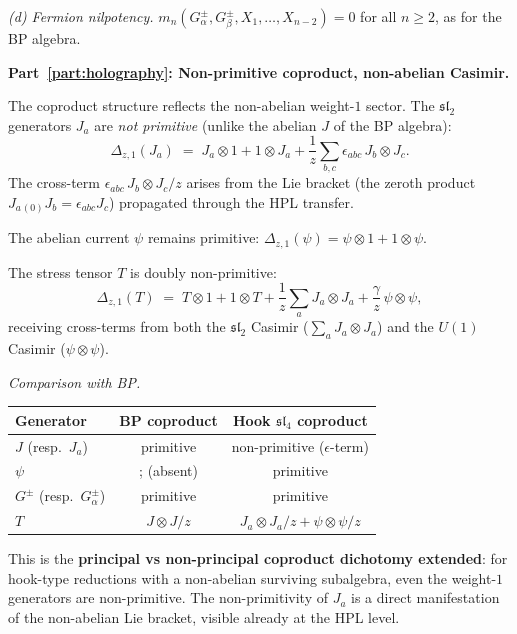 \begin{computation}
\emph{(d) Fermion nilpotency.}
$m_n(G^\pm_\alpha, G^\pm_\beta, X_1, \ldots, X_{n-2})
= 0$ for all $n \ge 2$, as for the BP algebra.

\medskip
\noindent\textbf{Part~\ref{part:holography}: Non-primitive coproduct,
non-abelian Casimir.}

The coproduct structure reflects the non-abelian
weight-$1$ sector. The $\mathfrak{sl}_2$ generators
$J_a$ are \emph{not primitive} (unlike the abelian $J$
of the BP algebra):
\begin{equation}\label{eq:sl4hook-coproduct-J}
\Delta_{z,1}(J_a)
\;=\;
J_a \otimes 1 + 1 \otimes J_a
+ \frac{1}{z}\sum_{b,c}\epsilon_{abc}\,
J_b \otimes J_c.
\end{equation}
The cross-term $\epsilon_{abc}\,J_b \otimes J_c/z$
arises from the Lie bracket (the zeroth product
$J_a{}_{(0)}J_b = \epsilon_{abc}J_c$) propagated
through the HPL transfer.

The abelian current $\psi$ remains primitive:
$\Delta_{z,1}(\psi) = \psi \otimes 1 + 1 \otimes \psi$.

The stress tensor $T$ is doubly non-primitive:
\[
\Delta_{z,1}(T)
\;=\;
T \otimes 1 + 1 \otimes T
+ \frac{1}{z}\sum_a J_a \otimes J_a
+ \frac{\gamma}{z}\,\psi \otimes \psi,
\]
receiving cross-terms from both the $\mathfrak{sl}_2$
Casimir ($\sum_a J_a \otimes J_a$) and the $U(1)$
Casimir ($\psi \otimes \psi$).

\emph{Comparison with BP.}
\begin{center}
\renewcommand{\arraystretch}{1.15}
\begin{tabular}{lcc}
\textbf{Generator} & \textbf{BP coproduct}
 & \textbf{Hook $\mathfrak{sl}_4$ coproduct} \\
\hline
$J$ (resp.\ $J_a$) & primitive
 & non-primitive ($\epsilon$-term) \\
$\psi$ &; (absent)
 & primitive \\
$G^\pm$ (resp.\ $G^\pm_\alpha$) & primitive
 & primitive \\
$T$ & $J \otimes J/z$
 & $J_a \otimes J_a/z + \psi \otimes \psi/z$
\end{tabular}
\end{center}

This is the \textbf{principal vs non-principal coproduct
dichotomy extended}: for hook-type reductions with a
non-abelian surviving subalgebra, even the weight-$1$
generators are non-primitive. The non-primitivity of
$J_a$ is a direct manifestation of the non-abelian Lie
bracket, visible already at the HPL level.


\end{computation}
